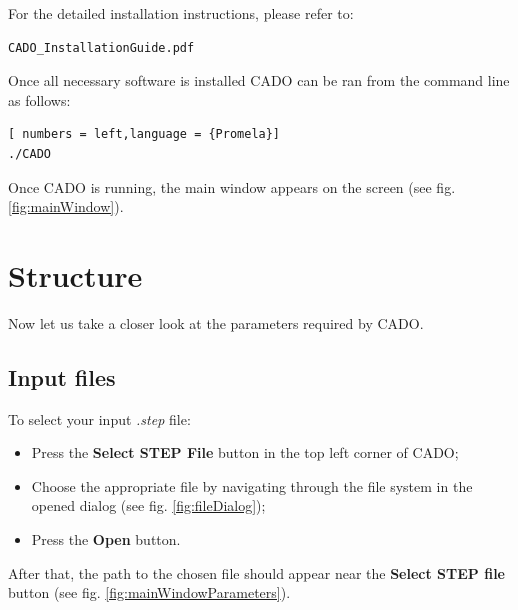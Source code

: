 \documentclass[
12pt, %
a4paper, %
oneside, %
headinclude,footinclude, %
BCOR5mm, %
]{scrartcl}
\begin{document}
For the detailed installation instructions, please refer to:
\begin{lstlisting}[language = {Promela}]
CADO_InstallationGuide.pdf
\end{lstlisting}

Once all necessary software is installed CADO can be ran from the command line as follows:
\begin{lstlisting}[ numbers = left,language = {Promela}]
./CADO
\end{lstlisting}

Once CADO is running, the main window appears on the screen (see fig. \ref{fig:mainWindow}).



\section{Structure}
\label{sec:structure}
Now let us take a closer look at the parameters required by CADO.

\subsection{Input files}
To select your input \textit{.step} file:
\begin{itemize}
\item Press the \textbf{Select STEP File} button in the top left corner of CADO;
\item Choose the appropriate file by navigating through the file system in the opened dialog (see fig. \ref{fig:fileDialog});
\item Press the \textbf{Open} button.
\end{itemize}

After that, the path to the chosen file should appear near the \textbf{Select STEP file} button (see fig. \ref{fig:mainWindowParameters}).
\end{document}
